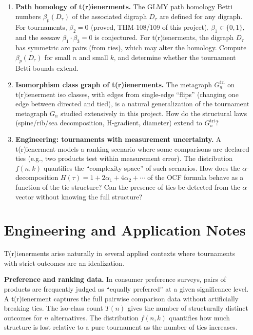 \documentclass[12pt,reqno]{amsart}
\theoremstyle{definition}
\theoremstyle{plain}
\begin{document}
\begin{enumerate}[label=\textbf{Q\arabic*.}]
\item \textbf{Path homology of t(r)ienerments.}
  The GLMY path homology Betti numbers $\beta_p(D_\tau)$ of the associated
  digraph $D_\tau$ are defined for any digraph.  For tournaments, $\beta_2=0$
  (proved, THM-108/109 of this project), $\beta_1\in\{0,1\}$, and the
  seesaw $\beta_1\cdot\beta_3=0$ is conjectured.  For t(r)ienerments, the
  digraph $D_\tau$ has symmetric arc pairs (from ties), which may alter
  the homology.  Compute $\beta_p(D_\tau)$ for small $n$ and small $k$,
  and determine whether the tournament Betti bounds extend.

\item \textbf{Isomorphism class graph of t(r)ienerments.}
  The metagraph $G_n^{\mathrm{tri}}$ on t(r)ienerment iso classes, with edges
  from single-edge ``flips'' (changing one edge between directed and tied),
  is a natural generalization of the tournament metagraph $G_n$ studied
  extensively in this project.  How do the structural laws (spine/rib/sea
  decomposition, H-gradient, diameter) extend to $G_n^{\mathrm{tri}}$?

\item \textbf{Engineering: tournaments with measurement uncertainty.}
  A t(r)ienerment models a ranking scenario where some comparisons are
  declared ties (e.g., two products test within measurement error).
  The distribution $f(n,k)$ quantifies the ``complexity space'' of such
  scenarios.  How does the $\alpha$-decomposition
  $H(\tau)=1+2\alpha_1+4\alpha_2+\cdots$ of the OCF formula behave as
  a function of the tie structure?  Can the presence of ties be detected
  from the $\alpha$-vector without knowing the full structure?

\end{enumerate}

\section{Engineering and Application Notes}
\label{sec:engineering}

T(r)ienerments arise naturally in several applied contexts where tournaments
with strict outcomes are an idealization.

\textbf{Preference and ranking data.}
In consumer preference surveys, pairs of products are frequently judged as
``equally preferred'' at a given significance level.  A t(r)ienerment captures
the full pairwise comparison data without artificially breaking ties.
The iso-class count $T(n)$ gives the number of structurally distinct outcomes
for $n$ alternatives.  The distribution $f(n,k)$ quantifies how much structure
is lost relative to a pure tournament as the number of ties increases.
\end{document}
